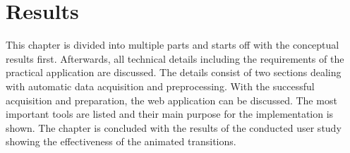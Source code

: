 \section{Results}
\label{s:results}
\cbstart
This chapter is divided into multiple parts and starts off with the conceptual results first. Afterwards, all technical details including the requirements of the practical application are discussed. The details consist of two sections dealing with automatic data acquisition and preprocessing. With the successful acquisition and preparation, the web application can be discussed. The most important tools are listed and their main purpose for the implementation is shown. The chapter is concluded with the results of the conducted user study showing the effectiveness of the animated transitions.
\cbend



